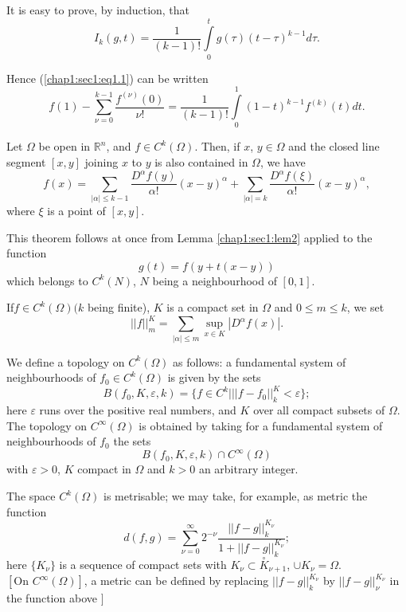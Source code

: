It is easy to prove, by induction, that 
$$
I_k (g, t) = \frac{1}{(k-1)!} \int \limits^t_0 g(\tau) (t- \tau)^{k-1} d \tau.
$$

Hence (\ref{chap1:sec1:eq1.1}) can be written 
\begin{equation}
  f(1) -  \sum^{k-1}_{\nu = 0} \frac{f^{(\nu)} (0)}{\nu !} =
  \frac{1}{(k-1) !} \int \limits^1_0 (1 -t)^{k-1} f^{(k)} (t)
  dt. \tag{1.2}\label{chap1:sec1:eq1.2} 
\end{equation}

\begin{theorem}\label{chap1:sec1:thm1} %
  Let $\Omega$ be open in $\mathbb{R}^n$, and $f \in C^k
  (\Omega)$. Then, if $x$, $y \in \Omega$ and the closed line segment
  $[x, y]$ joining $x$ to $y$ is also contained in $\Omega$, we have  
  $$
  f(x) = \sum_{| \alpha | \leq k-1} \frac{D^{\alpha} f(y)}{\alpha !}
  (x - y)^{\alpha} + \sum_{| \alpha | = k} \frac{D^{\alpha}
    f(\xi)}{\alpha !}(x-y)^{\alpha}, 
  $$
  where $\xi$ is a point of $[x, y]$.
\end{theorem}

This theorem follows at once from Lemma \ref{chap1:sec1:lem2} applied
  to the function 
$$
g(t) = f(y + t(x-y))
$$
which belongs to $C^k (N)$, $N$ being a neighbourhood of $[0, 1]$.

If\pageoriginale $f \in C^k (\Omega) (k$ being finite), $K$ is a compact set in
$\Omega$ and $0 \leq m \leq k$, we set  
$$
|| f ||^K_m = \sum_{| \alpha |\leq m} \sup_{x \in K} |D^{\alpha} f(x) |.
$$

We define a topology on $C^k (\Omega )$ as follows: a fundamental
system of neighbourhoods of $f_0 \in C^k (\Omega )$ is given by the
sets  
$$
B(f_0, K, \varepsilon, k) = \{ f \in C^k \big| || f - f_0 ||^K_k < \varepsilon
\}; 
$$
here $\varepsilon$ runs over the positive real numbers, and $K$ over
all compact subsets of $\Omega$. The topology on $C^{\infty}(\Omega)$
is obtained by taking for a fundamental system of neighbourhoods of
$f_0$ the sets  
$$
B(f_0, K, \varepsilon, k) \cap C^\infty (\Omega)
$$
with $\varepsilon > 0$, $K$ compact in $\Omega$ and $k > 0$ an arbitrary integer.

The space $C^k (\Omega)$ is metrisable; we may take, for example, as
metric the function 
$$
d (f, g) = \sum^{\infty}_{\nu = 0} 2^{-\nu} \frac{|| f-g
  ||^{K_{\nu}}_k}{1 + || f-g ||^{K_{\nu}}_k}; 
$$
here $\{ K_{\nu} \}$ is a sequence of compact sets with $K_{\nu}
\subset \overset{\circ}{K}_{\nu+1}$, $\cup K_{\nu} = \Omega$. $[\text{On~}
  C^{\infty} (\Omega)]$, a metric can be defined by replacing $|| f -
g||^{K_{\nu}}_k$ by $|| f - g||^{K_{\nu}}_{\nu}$ in the function above
$]$ 

